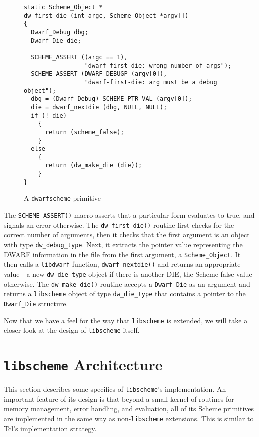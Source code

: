 \begin{figure}[htbp]
\begin{center}
\begin{verbatim}
static Scheme_Object *
dw_first_die (int argc, Scheme_Object *argv[])
{
  Dwarf_Debug dbg;
  Dwarf_Die die;

  SCHEME_ASSERT ((argc == 1), 
                 "dwarf-first-die: wrong number of args");
  SCHEME_ASSERT (DWARF_DEBUGP (argv[0]), 
                 "dwarf-first-die: arg must be a debug object");
  dbg = (Dwarf_Debug) SCHEME_PTR_VAL (argv[0]);
  die = dwarf_nextdie (dbg, NULL, NULL);
  if (! die)
    {
      return (scheme_false);
    }
  else
    {
      return (dw_make_die (die));
    }
}
\end{verbatim}
\end{center}  
  \caption{A {\tt dwarfscheme} primitive}
  \label{fig:prim}
\end{figure}

The \verb+SCHEME_ASSERT()+ macro asserts that a particular form
evaluates to true, and signals an error otherwise.  The
\verb+dw_first_die()+ routine first checks for the correct number
of arguments, then it checks that the first argument is an object with
type \verb+dw_debug_type+.  Next, it extracts the pointer value
representing the DWARF information in the file from the first
argument, a \verb+Scheme_Object+.  It then calls a \verb+libdwarf+
function, \verb+dwarf_nextdie()+ and returns an appropriate value---a
new \verb+dw_die_type+ object if there is another DIE, the Scheme
false value otherwise.  The \verb+dw_make_die()+ routine accepts a
\verb+Dwarf_Die+ as an argument and returns a \verb+libscheme+ object
of type \verb+dw_die_type+ that contains a pointer to the
\verb+Dwarf_Die+ structure.

Now that we have a feel for the way that \verb+libscheme+ is extended,
we will take a closer look at the design of \verb+libscheme+ itself.

\section{{\tt libscheme} Architecture}

This section describes some specifics of \verb+libscheme+'s
implementation.  An important feature of its design is that beyond a
small kernel of routines for memory management, error handling, and
evaluation, all of its Scheme primitives are implemented in the same
way as non-\verb+libscheme+ extensions.  This is similar to Tcl's
implementation strategy.

